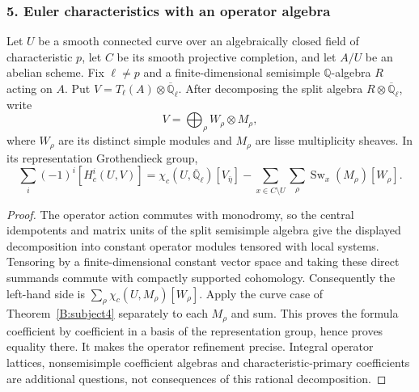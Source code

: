 \subsubsection{5. Euler characteristics with an operator algebra}
\begin{proposition}\label{B:subject5}
Let $U$ be a smooth connected curve over an algebraically closed field of characteristic $p$, let $C$ be its smooth projective completion, and let $A/U$ be an abelian scheme. Fix $\ell\ne p$ and a finite-dimensional semisimple $\mathbb Q$-algebra $R$ acting on $A$. Put $V=T_\ell(A)\otimes\overline{\mathbb Q}_\ell$. After decomposing the split algebra $R\otimes\overline{\mathbb Q}_\ell$, write
\[
 V=\bigoplus_\rho W_\rho\otimes M_\rho,
\]
where $W_\rho$ are its distinct simple modules and $M_\rho$ are lisse multiplicity sheaves. In its representation Grothendieck group,
\[
 \sum_i(-1)^i[H_c^i(U,V)]
 =\chi_c(U,\overline{\mathbb Q}_\ell)[V_{\bar\eta}]
 -\sum_{x\in C\setminus U}\sum_\rho\operatorname{Sw}_x(M_\rho)[W_\rho].
\]
\end{proposition}
\begin{proof}
The operator action commutes with monodromy, so the central idempotents and matrix units of the split semisimple algebra give the displayed decomposition into constant operator modules tensored with local systems. Tensoring by a finite-dimensional constant vector space and taking these direct summands commute with compactly supported cohomology. Consequently the left-hand side is $\sum_\rho\chi_c(U,M_\rho)[W_\rho]$. Apply the curve case of Theorem~\ref{B:subject4} separately to each $M_\rho$ and sum. This proves the formula coefficient by coefficient in a basis of the representation group, hence proves equality there. It makes the operator refinement precise. Integral operator lattices, nonsemisimple coefficient algebras and characteristic-primary coefficients are additional questions, not consequences of this rational decomposition.
\end{proof}

